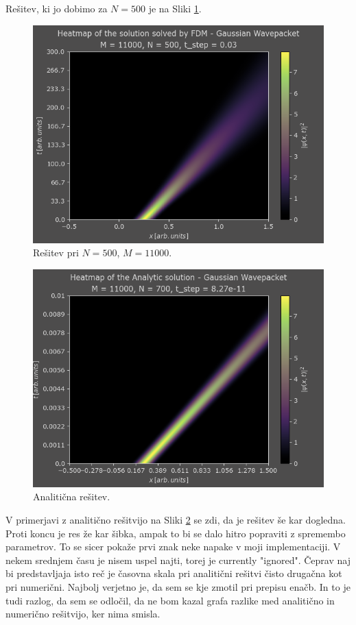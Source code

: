 \documentclass[a4paper]{article}
\begin{document}
Rešitev, ki jo dobimo za $N=500$ je na Sliki \ref{fig:gaussian_org}.

\begin{figure}[p]
    \centering
    \includegraphics[width=\textwidth]{./images/case2_N500_expanded.png}
    \caption{Rešitev pri $N=500$, $M=11000$.}
    \label{fig:gaussian_org}
\end{figure}

\begin{figure}[p]
    \centering
    \includegraphics[width=\textwidth]{./images/case2_analytic.png}
    \caption{Analitična rešitev.}
    \label{fig:gaussian_analytic}
\end{figure}

V primerjavi z analitično rešitvijo na Sliki \ref{fig:gaussian_analytic} se zdi, da je rešitev
še kar dogledna. Proti koncu je res že kar šibka, ampak to bi se dalo hitro popraviti z spremembo
parametrov. To se sicer pokaže prvi znak neke napake v moji implementaciji. V nekem srednjem času
je nisem uspel najti, torej je currently "ignored". Čeprav naj bi predstavljaja isto reč je 
časovna skala pri analitični rešitvi čisto drugačna kot pri numerični. Najbolj verjetno je, da sem
se kje zmotil pri prepisu enačb. In to je tudi razlog, da sem se odločil, da ne bom kazal grafa
razlike med analitično in numerično rešitvijo, ker nima smisla. \\
\end{document}
